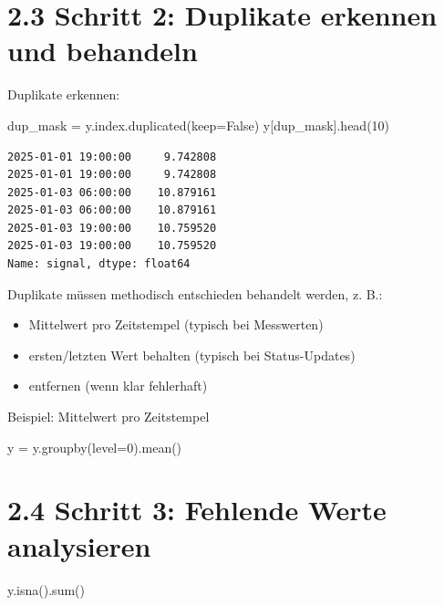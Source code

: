 \documentclass[
  ngerman,
  letterpaper,
  DIV=11]{scrreprt}
\newenvironment{Shaded}{\begin{snugshade}}{\end{snugshade}}
\newcommand{\BuiltInTok}[1]{\textcolor[rgb]{0.00,0.23,0.31}{#1}}
\newcommand{\DecValTok}[1]{\textcolor[rgb]{0.68,0.00,0.00}{#1}}
\newcommand{\NormalTok}[1]{\textcolor[rgb]{0.00,0.23,0.31}{#1}}
\newcommand{\OperatorTok}[1]{\textcolor[rgb]{0.37,0.37,0.37}{#1}}
\newcommand{\VariableTok}[1]{\textcolor[rgb]{0.07,0.07,0.07}{#1}}
\providecommand{\tightlist}{%
  \setlength{\itemsep}{0pt}\setlength{\parskip}{0pt}}
\begin{document}
\section{2.3 Schritt 2: Duplikate erkennen und
behandeln}\label{schritt-2-duplikate-erkennen-und-behandeln}

Duplikate erkennen:

\begin{Shaded}
\begin{Highlighting}[]
\NormalTok{dup\_mask }\OperatorTok{=}\NormalTok{ y.index.duplicated(keep}\OperatorTok{=}\VariableTok{False}\NormalTok{)}
\NormalTok{y[dup\_mask].head(}\DecValTok{10}\NormalTok{)}
\end{Highlighting}
\end{Shaded}

\begin{verbatim}
2025-01-01 19:00:00     9.742808
2025-01-01 19:00:00     9.742808
2025-01-03 06:00:00    10.879161
2025-01-03 06:00:00    10.879161
2025-01-03 19:00:00    10.759520
2025-01-03 19:00:00    10.759520
Name: signal, dtype: float64
\end{verbatim}

Duplikate müssen methodisch entschieden behandelt werden, z. B.:

\begin{itemize}
\tightlist
\item
  Mittelwert pro Zeitstempel (typisch bei Messwerten)
\item
  ersten/letzten Wert behalten (typisch bei Status-Updates)
\item
  entfernen (wenn klar fehlerhaft)
\end{itemize}

Beispiel: Mittelwert pro Zeitstempel

\begin{Shaded}
\begin{Highlighting}[]
\NormalTok{y }\OperatorTok{=}\NormalTok{ y.groupby(level}\OperatorTok{=}\DecValTok{0}\NormalTok{).mean()}
\end{Highlighting}
\end{Shaded}

\section{2.4 Schritt 3: Fehlende Werte
analysieren}\label{schritt-3-fehlende-werte-analysieren}

\begin{Shaded}
\begin{Highlighting}[]
\NormalTok{y.isna().}\BuiltInTok{sum}\NormalTok{()}
\end{Highlighting}
\end{Shaded}
\end{document}
